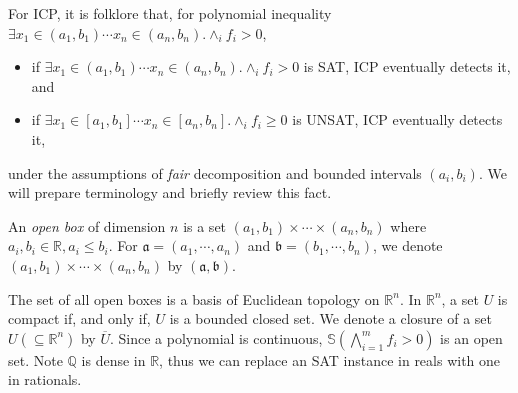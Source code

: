\documentclass[runningheads,a4paper,oribibl]{llncs}
\newcommand{\Real}{{\mathbb R}}
\newcommand{\Rat}{{\mathbb Q}}
\newcommand{\suppress}[1]{} %
\begin{document}
For ICP, it is folklore that, for polynomial inequality 
$\exists x_1 \in (a_1,b_1) \cdots x_n \in (a_n,b_n) . \wedge_{i} f_i > 0$, 
\begin{itemize}
\item if $\exists x_1 \in (a_1,b_1) \cdots x_n \in (a_n,b_n) . \wedge_{i} f_i > 0$ is SAT, 
ICP eventually detects it, and 
\item if $\exists x_1 \in [a_1,b_1] \cdots x_n \in [a_n,b_n] . \wedge_{i} f_i \geq 0$ is UNSAT, 
ICP eventually detects it, 
\end{itemize}
under the assumptions of {\em fair} decomposition and bounded intervals $(a_i,b_i)$. 
We will prepare terminology and briefly review this fact. 

\suppress{
\begin{definition} \label{def:poly}
A polynomial inequality is a bounded quantification 
$\exists x_1 \in I_1 \cdots x_n \in I_n. \psi(x_1,\cdots,x_n)$ 
such that 
\begin{itemize}
\item each $I_i$ is an open interval $x_i \in (a_i,b_i)$, and 
\item $\psi(x_1,\cdots,x_n)$ is a conjunction of $f_j > 0$ 
where $f_j$ is a polynomial over $\{x_1, \cdots, x_n\}$. 
\end{itemize}
$f_i > 0$ is called an atomic polynomial inequality (API). 
We denote $\mathbb{S}(F) = \{x \in \Real^n \mid F ~\text{holds}\}$.
\end{definition}

\begin{example} \label{examp:poly_ieq}
$\exists x \in (-1,3)~y \in (2,4) . (x^3y - y^4 > 0) \wedge (y^3 -xy >0)$
is an example of a polynomial inequality with 2 variables and 2 APIs. 
\end{example}
}

\begin{definition}
An \emph{open box} of dimension $n$ is a set $(a_1,b_1) \times \cdots \times (a_n,b_n)$ 
where $a_i, b_i \in \Real, a_i \leq b_i$.  
For $\mathfrak{a} = (a_1, \cdots, a_n)$ and $\mathfrak{b} = (b_1, \cdots, b_n)$, 
we denote $(a_1,b_1) \times \cdots \times (a_n,b_n)$ by $(\mathfrak{a}, \mathfrak{b})$. 
\end{definition}

The set of all open boxes is a basis of Euclidean topology on $\Real^n$. 
In $\Real^n$, a set $U$ is compact if, and only if, $U$ is a bounded closed set. 
We denote a closure of a set $U (\subseteq \Real^n)$ by $\overline{U}$. 
%
Since a polynomial is continuous, 
$\mathbb{S}(\bigwedge \limits_{i=1}^m f_i > 0)$ is an open set. 
Note $\Rat$ is dense in $\Real$, thus we can replace an SAT instance in reals with one in rationals. 
\end{document}
